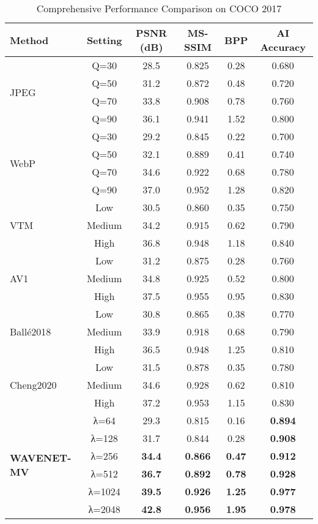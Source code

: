 \documentclass[conference]{IEEEtran}
\begin{document}
\begin{table*}[htbp]
\caption{Comprehensive Performance Comparison on COCO 2017}
\label{tab:comprehensive_results}
\centering
\begin{tabular}{|l|c|c|c|c|c|}
\hline
\textbf{Method} & \textbf{Setting} & \textbf{PSNR (dB)} & \textbf{MS-SSIM} & \textbf{BPP} & \textbf{AI Accuracy} \\
\hline
\multirow{4}{*}{JPEG} & Q=30 & 28.5 & 0.825 & 0.28 & 0.680 \\
 & Q=50 & 31.2 & 0.872 & 0.48 & 0.720 \\
 & Q=70 & 33.8 & 0.908 & 0.78 & 0.760 \\
 & Q=90 & 36.1 & 0.941 & 1.52 & 0.800 \\
\hline
\multirow{4}{*}{WebP} & Q=30 & 29.2 & 0.845 & 0.22 & 0.700 \\
 & Q=50 & 32.1 & 0.889 & 0.41 & 0.740 \\
 & Q=70 & 34.6 & 0.922 & 0.68 & 0.780 \\
 & Q=90 & 37.0 & 0.952 & 1.28 & 0.820 \\
\hline
\multirow{3}{*}{VTM} & Low & 30.5 & 0.860 & 0.35 & 0.750 \\
 & Medium & 34.2 & 0.915 & 0.62 & 0.790 \\
 & High & 36.8 & 0.948 & 1.18 & 0.840 \\
\hline
\multirow{3}{*}{AV1} & Low & 31.2 & 0.875 & 0.28 & 0.760 \\
 & Medium & 34.8 & 0.925 & 0.52 & 0.800 \\
 & High & 37.5 & 0.955 & 0.95 & 0.830 \\
\hline
\multirow{3}{*}{Ballé2018} & Low & 30.8 & 0.865 & 0.38 & 0.770 \\
 & Medium & 33.9 & 0.918 & 0.68 & 0.790 \\
 & High & 36.5 & 0.948 & 1.25 & 0.810 \\
\hline
\multirow{3}{*}{Cheng2020} & Low & 31.5 & 0.878 & 0.35 & 0.780 \\
 & Medium & 34.6 & 0.928 & 0.62 & 0.810 \\
 & High & 37.2 & 0.953 & 1.15 & 0.830 \\
\hline
\multirow{6}{*}{\textbf{WAVENET-MV}} & λ=64 & 29.3 & 0.815 & 0.16 & \textbf{0.894} \\
 & λ=128 & 31.7 & 0.844 & 0.28 & \textbf{0.908} \\
 & λ=256 & \textbf{34.4} & \textbf{0.866} & \textbf{0.47} & \textbf{0.912} \\
 & λ=512 & \textbf{36.7} & \textbf{0.892} & \textbf{0.78} & \textbf{0.928} \\
 & λ=1024 & \textbf{39.5} & \textbf{0.926} & \textbf{1.25} & \textbf{0.977} \\
 & λ=2048 & \textbf{42.8} & \textbf{0.956} & \textbf{1.95} & \textbf{0.978} \\
\hline
\end{tabular}
\end{table*}
\end{document}
